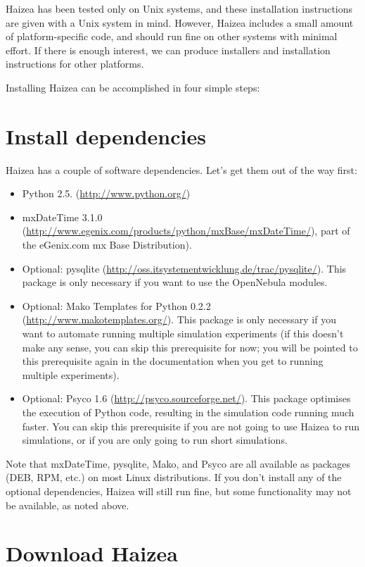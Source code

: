 Haizea has been tested only on Unix systems, and these installation instructions are given with a Unix system in mind. However, Haizea includes a small amount of platform-specific code, and should run fine on other systems with minimal effort. If there is enough interest, we can produce installers and installation instructions for other platforms.

Installing Haizea can be accomplished in four simple steps:

\section{Install dependencies}

Haizea has a couple of software dependencies. Let's get them out of the way first:

\begin{itemize}
\item Python 2.5. (\url{http://www.python.org/})
\item mxDateTime 3.1.0 (\url{http://www.egenix.com/products/python/mxBase/mxDateTime/}), part of the eGenix.com mx Base Distribution).
\item Optional: pysqlite (\url{http://oss.itsystementwicklung.de/trac/pysqlite/}). This package is only necessary if you want to use the OpenNebula modules.
\item Optional: Mako Templates for Python 0.2.2 (\url{http://www.makotemplates.org/}). This package is only necessary if you want to automate running multiple simulation experiments (if this doesn't make any sense, you can skip this prerequisite for now; you will be pointed to this prerequisite again in the documentation when you get to running multiple experiments).
\item Optional: Psyco 1.6 (\url{http://psyco.sourceforge.net/}). This package optimises the execution of Python code, resulting in the simulation code running much faster. You can skip this prerequisite if you are not going to use Haizea to run simulations, or if you are only going to run short simulations.
\end{itemize}

Note that mxDateTime, pysqlite, Mako, and Psyco are all available as packages (DEB, RPM, etc.) on most Linux distributions. If you don't install any of the optional dependencies, Haizea will still run fine, but some functionality may not be available, as noted above.

\section{Download Haizea}

